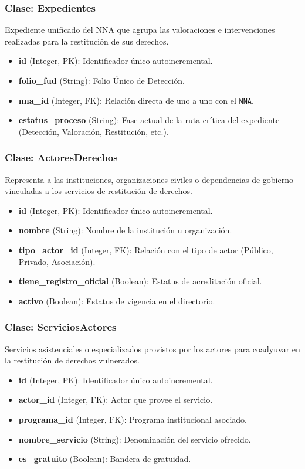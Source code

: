 \subsubsection{Clase: Expedientes}
Expediente unificado del NNA que agrupa las valoraciones e intervenciones realizadas para la restitución de sus derechos.
\begin{itemize}
	\item \textbf{id} (Integer, PK): Identificador único autoincremental.
	\item \textbf{folio\_fud} (String): Folio Único de Detección.
	\item \textbf{nna\_id} (Integer, FK): Relación directa de uno a uno con el \texttt{NNA}.
	\item \textbf{estatus\_proceso} (String): Fase actual de la ruta crítica del expediente (Detección, Valoración, Restitución, etc.).
\end{itemize}

\subsubsection{Clase: ActoresDerechos}
Representa a las instituciones, organizaciones civiles o dependencias de gobierno vinculadas a los servicios de restitución de derechos.
\begin{itemize}
	\item \textbf{id} (Integer, PK): Identificador único autoincremental.
	\item \textbf{nombre} (String): Nombre de la institución u organización.
	\item \textbf{tipo\_actor\_id} (Integer, FK): Relación con el tipo de actor (Público, Privado, Asociación).
	\item \textbf{tiene\_registro\_oficial} (Boolean): Estatus de acreditación oficial.
	\item \textbf{activo} (Boolean): Estatus de vigencia en el directorio.
\end{itemize}

\subsubsection{Clase: ServiciosActores}
Servicios asistenciales o especializados provistos por los actores para coadyuvar en la restitución de derechos vulnerados.
\begin{itemize}
	\item \textbf{id} (Integer, PK): Identificador único autoincremental.
	\item \textbf{actor\_id} (Integer, FK): Actor que provee el servicio.
	\item \textbf{programa\_id} (Integer, FK): Programa institucional asociado.
	\item \textbf{nombre\_servicio} (String): Denominación del servicio ofrecido.
	\item \textbf{es\_gratuito} (Boolean): Bandera de gratuidad.
\end{itemize}